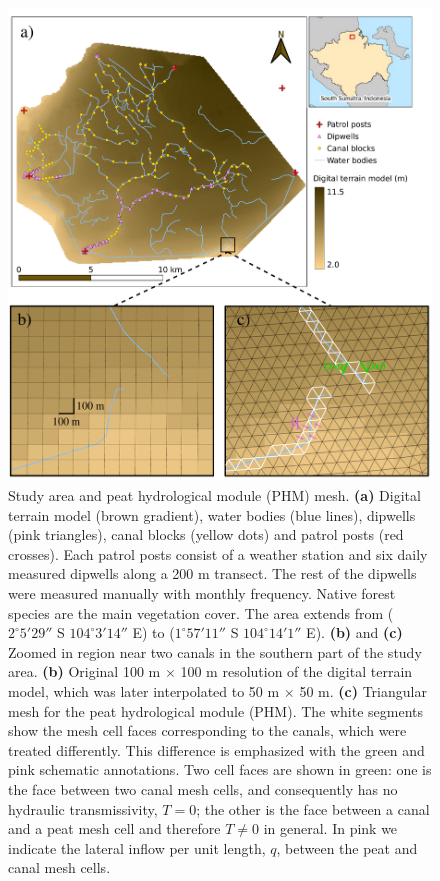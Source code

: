 \documentclass[bg, manuscript]{copernicus}
\begin{document}
\begin{figure}[H]
\includegraphics[width=12 cm]{figs/area+zoominDTM.pdf}
\caption{Study area and peat hydrological module (PHM) mesh. \textbf{(a)} Digital terrain model (brown gradient), water bodies (blue lines), dipwells (pink triangles), canal blocks (yellow dots) and patrol posts (red crosses). Each patrol posts consist of a weather station and six daily measured  dipwells along a 200 \unit{m} transect. The rest of the dipwells were measured manually with monthly frequency. Native forest species are the main vegetation cover. The area extends from ($2^\circ 5' 29''$ S $104^\circ 3' 14''$ E) to ($1^\circ 57' 11''$ S $104^\circ 14' 1''$ E). \textbf{(b)} and \textbf{(c)} Zoomed in region near two canals in the southern part of the study area. \textbf{(b)} Original 100 \unit{m} $\times$ 100 \unit{m} resolution of the digital terrain model, which was later interpolated to 50 \unit{m} $\times$ 50 \unit{m}. \textbf{(c)} Triangular mesh for the peat hydrological module (PHM). The white segments show the mesh cell faces corresponding to the canals, which were treated differently. This difference is emphasized with the green and pink schematic annotations. Two cell faces are shown in green: one is the face between two canal mesh cells, and consequently has no hydraulic transmissivity, $T=0$; the other is the face between a canal and a peat mesh cell and therefore $T\neq0$ in general. In pink we indicate the lateral inflow per unit length, $q$, between the peat and canal mesh cells.}
\label{fig:study_area}
\end{figure}   
\end{document}
